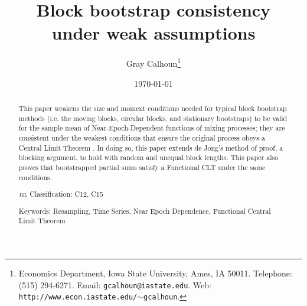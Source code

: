 \documentclass[12pt]{article}
\theoremstyle{definition}
\begin{document}
\author{Gray Calhoun\thanks{Economics Department, Iowa State
    University, Ames, IA 50011. Telephone: (515) 294-6271.  Email:
    \texttt{gcalhoun@iastate.edu}. Web: \texttt{http://www.econ.iastate.edu/$\sim$gcalhoun}.}}
\title{Block bootstrap consistency\\under weak assumptions}
\date{\today}
\maketitle

\begin{abstract}\noindent
  This paper weakens the size and moment conditions needed for typical
  block bootstrap methods (i.e. the moving blocks, circular blocks,
  and stationary bootstraps) to be valid for the sample mean of
  Near-Epoch-Dependent functions of mixing processes; they are
  consistent under the weakest conditions that ensure the original
  process obeys a Central Limit Theorem \citep[those
    of][\textit{Econometric Theory}]{Jon:97}.  In doing so, this paper
  extends de Jong's method of proof, a blocking argument, to hold with
  random and unequal block lengths.  This paper also proves that
  bootstrapped partial sums satisfy a Functional CLT under the same
  conditions.

  \noindent \textsc{jel} Classification: C12, C15

  \noindent Keywords: Resampling, Time Series, Near Epoch Dependence,
  Functional Central Limit Theorem
\end{abstract}
\end{document}
